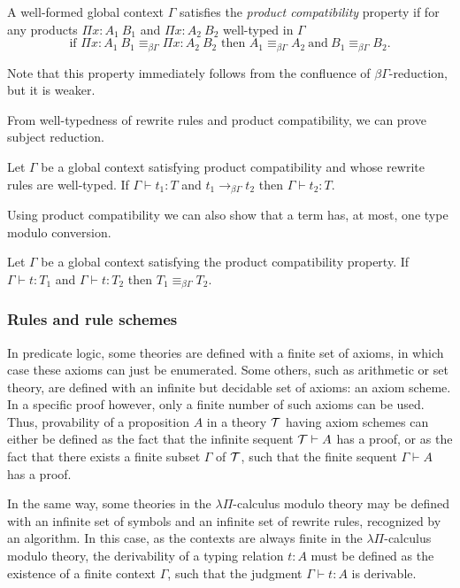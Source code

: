 \documentclass[english]{lipics}
\newcommand\T{{\cal T}}
\newcommand\eqbg{\equiv_{\beta\Gamma}}
\newcommand\redbg{\rightarrow_{\beta\Gamma}}
\begin{document}
\begin{definition}

A well-formed global context $\Gamma$ satisfies the {\em product
compatibility} property if for any products $\Pi x:A_1~B_1$ and
$\Pi x:A_2~B_2$ well-typed in $\Gamma$
$$\mbox{if } \Pi x:A_1~B_1 \eqbg \Pi x:A_2~B_2 \mbox{ then } A_1 \eqbg
A_2~\text{and}~B_1 \eqbg B_2 \mbox{.}$$
\end{definition}

Note that this property immediately follows from the confluence of
$\beta\Gamma$-reduction, but it is weaker.

From well-typedness of rewrite rules and product compatibility, we can prove
subject reduction.

\begin{lemma}
Let $\Gamma$ be a global context satisfying product compatibility
and whose rewrite rules are well-typed.
If $\Gamma \vdash t_1 : T$ and $t_1 \redbg t_2$
then $\Gamma \vdash t_2 : T$.
\end{lemma}

Using product compatibility we can also show that a term has, at most,
one type modulo conversion.

\begin{lemma}
Let $\Gamma$ be a global context satisfying the product compatibility property.
If $\Gamma \vdash t : T_1$ and $\Gamma \vdash t : T_2$
then $T_1 \eqbg T_2$.
\end{lemma}

\subsubsection{Rules and rule schemes}
\label{sec:infinite}

In predicate logic, some theories are defined with a finite set of
axioms, in which case these axioms can just be enumerated. Some
others, such as arithmetic or set theory, are defined with an infinite
but decidable set of axioms: an axiom scheme.  In a specific proof
however, only a finite number of such axioms can be used. Thus,
provability of a proposition $A$ in a theory $\T$ having axiom schemes
can either be defined as the fact that the infinite sequent $\T \vdash
A$ has a proof, or as the fact that there exists a finite subset
$\Gamma$ of $\T$, such that the finite sequent $\Gamma \vdash A$ has a
proof.

In the same way, some theories in the $\lambda \Pi$-calculus modulo
theory may be defined with an infinite set of symbols and an infinite
set of rewrite rules, recognized by an algorithm. In this case, as the
contexts are always finite in the $\lambda \Pi$-calculus modulo theory,
the derivability of a typing relation $t:A$ must be
defined as the existence of a finite context $\Gamma$, such that the
judgment $\Gamma \vdash t:A$ is derivable.
\end{document}
